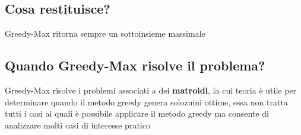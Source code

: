 \subsection{Cosa restituisce?}
Greedy-Max ritorna sempre un  sottoinsieme massimale

\subsection{Quando Greedy-Max risolve il problema?}
Greedy-Max risolve i problemi associati a dei \textbf{matroidi}, la cui teoria è utile per determinare quando il metodo greedy genera solozuini ottime, essa non tratta tutti i casi ai quali è possibile applicare il metodo greedy ma consente di analizzare molti casi di interesse pratico